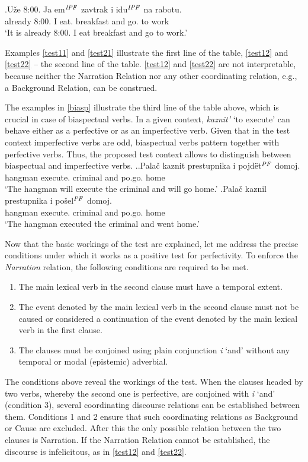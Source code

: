 \exg.\label{ex:nar:imp}U\v{z}e 8:00. Ja em$^{\mathit{IPF}}$ zavtrak i idu$^{\mathit{IPF}}$ na rabotu.\\
already 8:00. I eat. breakfast and go. to work\\
\vspace{0.5em}
`It is already 8:00. I eat breakfast and go to work.'

Examples \ref{test11} and \ref{test21} illustrate the first line of the table, \ref{test12} and \ref{test22} -- the second line of the table. \ref{test12} and \ref{test22} are not interpretable, because neither the Narration Relation nor any other coordinating relation, e.g., a Background Relation, can be construed. 

The examples in \ref{biasp} illustrate the third line of the table above, which is crucial in case of biaspectual verbs. In a given context, \textit{kaznit'} `to execute' can behave either as a perfective or as an imperfective verb. Given that in the test context imperfective verbs are odd, biaspectual verbs pattern together with perfective verbs. Thus, the proposed test context allows to distinguish between biaspectual and imperfective verbs. 
\ex.\label{biasp}\ag.Pala\v{c} kaznit prestupnika i pojd\"et$^{\mathit{PF}}$ domoj.\\
hangman execute. criminal and po.go. home\\
`The hangman will execute the criminal and will go home.'
\bg.Pala\v{c} kaznil prestupnika i po\v{s}el$^{\mathit{PF}}$ domoj.\\
hangman execute. criminal and po.go. home\\
`The hangman executed the criminal and went home.'

Now that the basic workings of the test are explained, let me address the precise conditions under which it works as a positive test for perfectivity. To enforce the \textit{Narration} relation, the following conditions are required to be met.
\begin{enumerate}
\item The main lexical verb in the second clause must have a temporal extent.
\item The event denoted by the main lexical verb in the second clause must not be caused or considered a continuation of the event denoted by the main lexical verb in the first clause.
\item The clauses must be conjoined using plain conjunction \textit{i} `and' without any temporal or modal (epistemic) adverbial.
\end{enumerate}
The conditions above reveal the workings of the test. When the clauses headed by two verbs, whereby the second one is perfective, are conjoined with \textit{i} `and' (condition 3), several coordinating discourse relations can be established between them. Conditions 1 and 2 ensure that such coordinating relations as Background or Cause are excluded. After this the only possible relation between the two clauses is Narration. If the Narration Relation  cannot be established, the discourse is infelicitous, as in \ref{test12} and \ref{test22}.

